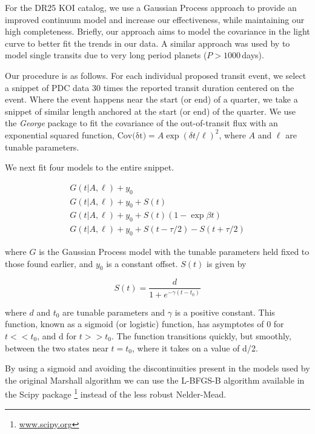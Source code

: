 For the DR25 KOI catalog, we use a Gaussian Process approach \citep[GP,][]{Rasmussen10} to provide an improved continuum model and increase our effectiveness, while maintaining our high completeness. Briefly, our approach aims to model the covariance in the light curve to better fit the trends in our data.
A similar approach was used by \citet{ForemanMackey16} to model single transits due to very long period planets ($P > 1000$\,days).

Our procedure is as follows. For each individual proposed transit event, we select a snippet of PDC data 30 times the reported transit duration centered on the event. Where the event happens near the start (or end) of a quarter, we take a snippet of similar length anchored at the start (or end) of the quarter. We use the \emph{George} package \citep{Ambikasaran14} to fit the covariance of the out-of-transit flux with an exponential squared function, $ {\mathrm{Cov(\delta t})} = A \exp{ (\delta t/\ell)^2}$, where $A$ and $\ell$ are tunable parameters. 

We next fit four models to the entire snippet.

\begin{equation}
\left.\begin{aligned}
G(t | A, \ell) + y_0 \\
G(t | A, \ell) + y_0 + S(t)\\
G(t | A, \ell) + y_0 + S(t)(1 - \exp{\beta t})\\
G(t | A, \ell) + y_0 + S(t - \tau/2) - S(t + \tau/2) 
\end{aligned}\right.
\label{e:marshall}
\end{equation}

\noindent
where $G$ is the Gaussian Process model with the tunable parameters held fixed to those found earlier, and $y_0$ is a constant offset. $S(t)$ is given by

\begin{equation}
S(t) = \frac{d}{1 + e^{-\gamma (t-t_0)} }
\end{equation}

\noindent
where $d$ and $t_0$ are tunable parameters and $\gamma$ is a positive constant. This function, known as a sigmoid (or logistic) function, has asymptotes of 0 for $t<<t_0$, and d for $t>>t_0$. The function transitions quickly, but smoothly, between the two states near $t=t_0$, where it takes on a value of d/2. 

By using a sigmoid and avoiding the discontinuities present in the models used by the original Marshall algorithm \citep{Mullally2016} we can use the L-BFGS-B algorithm \citep{Byrd95} available in the Scipy package \footnote{\url{www.scipy.org}} instead of the less robust Nelder-Mead.

